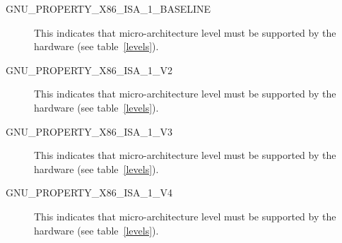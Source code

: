 \begin{description}
 \item[GNU_PROPERTY_X86_ISA_1_BASELINE] This indicates that 
   micro-architecture level must be supported by the hardware
   (see table~\ref{levels}).
 \item[GNU_PROPERTY_X86_ISA_1_V2] This indicates that micro-architecture
   level  must be supported by the hardware
   (see table~\ref{levels}).
 \item[GNU_PROPERTY_X86_ISA_1_V3] This indicates that micro-architecture
   level  must be supported by the hardware
   (see table~\ref{levels}).
 \item[GNU_PROPERTY_X86_ISA_1_V4] This indicates that micro-architecture
   level  must be supported by the hardware
   (see table~\ref{levels}).
\end{description}

